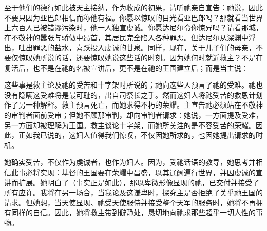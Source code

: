至于他们的德行如此被天主接纳，作为收成的初果，请听祂亲自宣告：祂说，因此不要只因为亚巴郎相信而称他有福。你愿以惊叹的目光看亚巴郎吗？那就看当世界上六百人已被错谬污染时，他一人独宣虔诚。你愿达尼尔令你惊异吗？请看那城，在不敬神的嚣张与骄傲中昂首，其居民完全陷入各种罪恶。但达尼尔从深渊中浮出，吐出罪恶的盐水，喜跃投入虔诚的甘泉。同样，现在，关于儿子们的母亲，不要仅惊叹她所说的话，还要惊叹她说这些话的时刻。因为她何时就近救主？不是在复活后，也不是在祂的名被宣讲后，更不是在祂的王国建立后；而是当主说：\par

这些事是救主论及祂的受苦和十字架时所说的；祂向这些人预言了祂的受难。祂也没有隐瞒这受难将是最可耻的，出自司祭长之手。然而这妇人将祂受苦的救恩计划作了另一种解释。救主预言死亡，而她求得不朽的荣耀。主宣告祂必须站在不敬神的审判者面前受审；但她不顾那审判，却向审判者请求：她说，一方面提及受难，另一方面却被理解为王国。救主谈论十字架，而她所关注的是不容受苦的荣耀。因此，正如我已说的，这妇人值得我们惊叹，不仅因她所求的，也因她提出请求的时机。\par

她确实受苦，不仅作为虔诚者，也作为妇人。因为，受祂话语的教导，她思考并相信此事必将实现：基督的王国要在荣耀中昌盛，以其辽阔遍行世界，并因虔诚的宣讲而扩展。她明白了（事实正是如此），那以卑微形像显现的祂，已交付并接受了所有应许。我将在另一场合，当我论及这谦卑时，探究主是否拒绝了关乎祂王国的请求。但她想，当天使显现、祂受天使服侍并接受整个天军的服务时，她将不再拥有同样的自信。因此，她将救主带到僻静处，恳切地向祂求那些超乎一切人性的事物。\par

